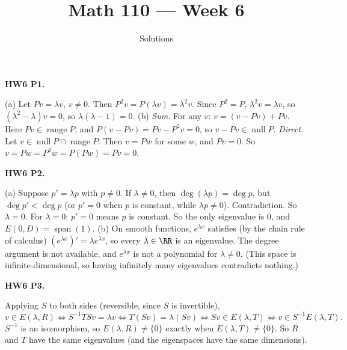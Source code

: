 \documentclass[10pt]{scrartcl}
\title{Math 110 --- Week 6}
\subtitle{Solutions}
\author{}\date{}\ihead{}
\DeclareMathOperator{\spn}{span}\DeclareMathOperator{\nul}{null}\DeclareMathOperator{\range}{range}
\begin{document}
\maketitle

\begin{prob}\textbf{HW6 P1.}\par{}
\begin{steps}
  \ii (a) Let $Pv=\lambda v$, $v\ne0$. Then $P^2v=P(\lambda v)=\lambda^2v$. Since $P^2=P$, $\lambda^2v=\lambda v$, so $(\lambda^2-\lambda)v=0$, so $\lambda(\lambda-1)=0$.
  \ii (b) \emph{Sum.} For any $v$: $v=(v-Pv)+Pv$. Here $Pv\in\range P$, and $P(v-Pv)=Pv-P^2v=0$, so $v-Pv\in\nul P$.
  \ii \emph{Direct.} Let $v\in\nul P\cap\range P$. Then $v=Pw$ for some $w$, and $Pv=0$. So $v=Pw=P^2w=P(Pw)=Pv=0$.
\end{steps}
\end{prob}

\begin{prob}\textbf{HW6 P2.}\par{}
\begin{steps}
  \ii (a) Suppose $p'=\lambda p$ with $p\ne0$. If $\lambda\ne0$, then $\deg(\lambda p)=\deg p$, but $\deg p'<\deg p$ (or $p'=0$ when $p$ is constant, while $\lambda p\ne0$). Contradiction. So $\lambda=0$.
  \ii For $\lambda=0$: $p'=0$ means $p$ is constant. So the only eigenvalue is $0$, and $E(0,D)=\spn(1)$.
  \ii (b) On smooth functions, $e^{\lambda x}$ satisfies (by the chain rule of calculus) $(e^{\lambda x})'=\lambda e^{\lambda x}$, so every $\lambda\in\RR$ is an eigenvalue. The degree argument is not available, and $e^{\lambda x}$ is not a polynomial for $\lambda\ne0$. (This space is infinite-dimensional, so having infinitely many eigenvalues contradicts nothing.)
\end{steps}
\end{prob}

\begin{prob}\textbf{HW6 P3.}\par{}
\begin{steps}
  \ii Applying $S$ to both sides (reversible, since $S$ is invertible),
  \[
    v\in E(\lambda,R)\iff S^{-1}TSv=\lambda v\iff T(Sv)=\lambda (Sv)\iff Sv\in E(\lambda,T)\iff v\in S^{-1}E(\lambda,T).
  \]
  \ii $S^{-1}$ is an isomorphism, so $E(\lambda,R)\ne\{0\}$ exactly when $E(\lambda,T)\ne\{0\}$. So $R$ and $T$ have the same eigenvalues (and the eigenspaces have the same dimensions).
\end{steps}
\end{prob}
\end{document}
